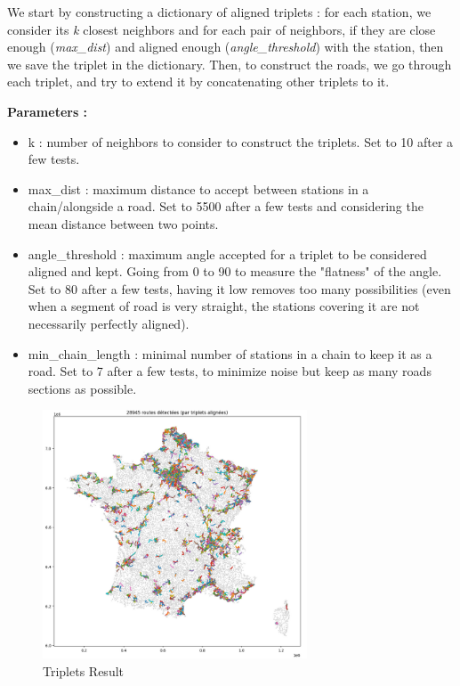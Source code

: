 \documentclass[main.tex]{subfiles}
\begin{document}
We start by constructing a dictionary of aligned triplets : for each station, we consider its \textit{k} closest neighbors and for each pair of neighbors, if they are close enough (\textit{max\_dist}) and aligned enough (\textit{angle\_threshold}) with the station, then we save the triplet in the dictionary. Then, to construct the roads, we go through each triplet, and try to extend it by concatenating other triplets to it. 

\textbf{Parameters : }
\begin{itemize}
    \item k : number of neighbors to consider to construct the triplets. Set to 10 after a few tests.
    \item max\_dist : maximum distance to accept between stations in a chain/alongside a road. Set to 5500 after a few tests and considering the mean distance between two points.
    \item angle\_threshold : maximum angle accepted for a triplet to be considered aligned and kept. Going from 0 to 90 to measure the "flatness" of the angle. Set to 80 after a few tests, having it low removes too many possibilities (even when a segment of road is very straight, the stations covering it are not necessarily perfectly aligned).
    \item min\_chain\_length : minimal number of stations in a chain to keep it as a road. Set to 7 after a few tests, to minimize noise but keep as many roads sections as possible. 
\end{itemize}

\begin{figure}[H]
    \centering
    \includegraphics[width=0.7\textwidth]{Images/Res_Triplets.png}
    \caption{Triplets Result}
\end{figure}
\end{document}
